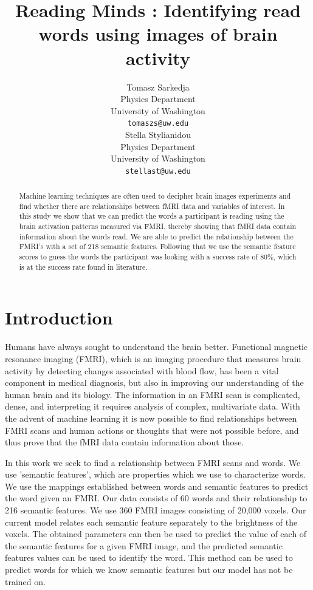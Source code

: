 \documentclass{article} %
\title{Reading Minds : Identifying read words using images of brain activity}
\author{
Tomasz Sarkedja \\
Physics Department\\
University of Washington\\
\texttt{tomaszs@uw.edu} \\
\And
Stella Stylianidou \\
Physics Department\\
University of Washington\\
\texttt{stellast@uw.edu} \\
}
\begin{document}
\maketitle

\begin{abstract}
Machine learning techniques are often used to decipher brain images experiments and find whether there are relationships between fMRI data and variables of interest. In this study we show that we can predict the words a participant is reading using the brain activation patterns measured via FMRI, thereby showing that fMRI data contain information about the words read. We are able to predict the relationship between the FMRI's with a set of 218 semantic features. Following that we use the semantic feature scores to guess the words the participant was looking with a success rate of 80\%, which is at the success rate found in literature. 

\end{abstract}

\section{Introduction}

Humans have always sought to understand the brain better. Functional magnetic resonance imaging (FMRI), which is an imaging procedure that measures brain activity by detecting changes associated with blood flow, has been a vital component in medical diagnosis, but also in improving our understanding of the human brain and its biology. The information in an FMRI scan is complicated, dense, and interpreting it requires analysis of complex, multivariate data\cite{Pereira2009S199}. With the advent of machine learning it is now possible to find relationships between FMRI scans and human actions or thoughts that were not possible before, and thus prove that the fMRI data contain information about those.

In this work we seek to find a relationship between FMRI scans and words. We use 'semantic features', which are properties which we use to characterize words. We use the mappings established between words and semantic features to predict the word given an FMRI. Our data consists of 60 words and their relationship to 216 semantic features. We use 360 FMRI images consisting of 20,000 voxels. Our current model relates each semantic feature separately to the brightness of the voxels. The obtained parameters can then be used to predict the value of each of the semantic features for a given FMRI image, and the predicted semantic features values can be used to identify the word. This method can be used to predict words for which we know semantic features but our model has not be trained on.
\end{document}
